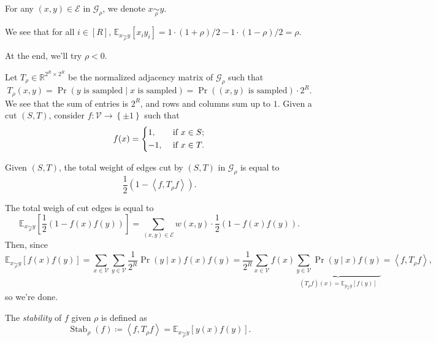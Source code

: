 \begin{notation}
	For any \((x, y)\in \mathcal{E} \) in \(\mathcal{G} _\rho \), we denote \(x \underset{\rho }{\sim } y\).
\end{notation}

We see that for all \(i\in [R]\), \(\mathbb{E}_{x \underset{\rho }{\sim }y }\left[x_i y_i \right] = 1\cdot (1+\rho )/2 - 1\cdot (1 - \rho ) / 2 = \rho \).

\begin{note}
	At the end, we'll try \(\rho < 0\).
\end{note}

Let \(T_\rho \in \mathbb{R} ^{2^R \times 2^R}\) be the normalized adjacency matrix of \(\mathcal{G} _\rho \) such that
\[
	T_{\rho } (x, y)
	= \Pr_{}(\text{\(y\) is sampled} \mid \text{\(x\) is sampled} )
	= \Pr_{}(\text{\((x, y)\) is sampled} ) \cdot 2^R.
\]
We see that the sum of entries is \(2^R\), and rows and columns sum up to \(1\). Given a cut \((S, T)\), consider \(f\colon \mathcal{V} \to \left\{ \pm 1 \right\} \) such that
\[
	f(x) = \begin{dcases}
		1,  & \text{ if } x\in S ; \\
		-1, & \text{ if } x\in T .
	\end{dcases}
\]

\begin{claim}
	Given \((S, T)\), the total weight of edges cut by \((S, T)\) in \(\mathcal{G} _{\rho }\) is equal to
	\[
		\frac{1}{2} (1 - \left\langle f, T_\rho f \right\rangle ).
	\]
\end{claim}
\begin{explanation}
	The total weigh of cut edges is equal to
	\[
		\mathbb{E}_{x \underset{\rho }{\sim }y }\left[ \frac{1}{2} (1 - f(x) f(y)) \right]
		= \sum_{(x, y)\in \mathcal{E} } w(x, y)\cdot \frac{1}{2}(1 - f(x) f(y)).
	\]
	Then, since
	\[
		\mathbb{E}_{x \underset{\rho }{\sim } y}\left[f(x) f(y) \right]
		= \sum_{x\in \mathcal{V} } \sum_{y\in \mathcal{V} } \frac{1}{2^R} \Pr_{}(y\mid x) f(x) f(y)
		= \frac{1}{2^R} \sum_{x\in \mathcal{V} } f(x) \underbrace{\sum_{y\in \mathcal{V} } \Pr_{}(y\mid x) f(y)}_{(T_\rho f)(x) = \mathbb{E}_{y \underset{\rho }{\sim } y}\left[ f(y)\right] }
		= \left\langle f, T_{\rho } f \right\rangle,
	\]
	so we're done.
\end{explanation}

\begin{definition}[Stability]\label{def:stability}
	The \emph{stability} of \(f\) given \(\rho \) is defined as
	\[
		\mathop{\mathrm{Stab}}_\rho (f) \coloneqq \left\langle f, T_\rho f \right\rangle = \mathbb{E}_{x \underset{\rho }{\sim } y}\left[y(x)f(y) \right].
	\]
\end{definition}

